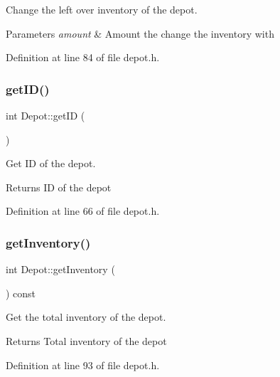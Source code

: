 Change the left over inventory of the depot. 
\begin{DoxyParams}{Parameters}
{\em amount} & Amount the change the inventory with \\
\hline
\end{DoxyParams}


Definition at line 84 of file depot.\+h.

\mbox{\label{class_depot_a4c45e9fa5fca7ad3db018f20ae80d774}} 
\subsubsection{\texorpdfstring{get\+I\+D()}{getID()}}
{\footnotesize\ttfamily int Depot\+::get\+ID (\begin{DoxyParamCaption}{ }\end{DoxyParamCaption})\hspace{0.3cm}{\ttfamily [inline]}}

Get ID of the depot. \begin{DoxyReturn}{Returns}
ID of the depot 
\end{DoxyReturn}


Definition at line 66 of file depot.\+h.

\mbox{\label{class_depot_ab8d9a6cba5eb3aa4d860e13435dd64df}} 
\subsubsection{\texorpdfstring{get\+Inventory()}{getInventory()}}
{\footnotesize\ttfamily int Depot\+::get\+Inventory (\begin{DoxyParamCaption}{ }\end{DoxyParamCaption}) const\hspace{0.3cm}{\ttfamily [inline]}}

Get the total inventory of the depot. \begin{DoxyReturn}{Returns}
Total inventory of the depot 
\end{DoxyReturn}


Definition at line 93 of file depot.\+h.

\mbox{\label{class_depot_a443f83f05f5b5f939f5f7d67a615239a}} 
